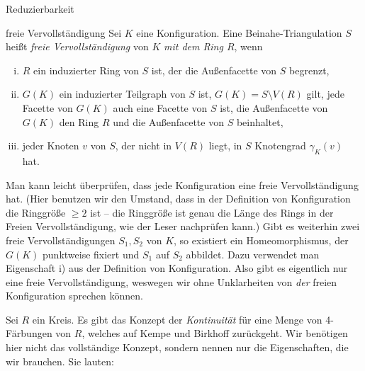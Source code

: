 \begin{section}{Reduzierbarkeit}
 \begin{definition}{freie Vervollständigung}
  Sei $K$ eine Konfiguration. Eine Beinahe-Triangulation $S$ heißt \textit{freie Vervollständigung} von $K$ \textit{mit dem Ring $R$}, wenn
  \begin{enumerate}[i)]
   \item $R$ ein induzierter Ring von $S$ ist, der die Außenfacette von $S$ begrenzt,
   \item $G(K)$ ein induzierter Teilgraph von $S$ ist, $G(K) = S \setminus V(R)$ gilt, jede Facette von $G(K)$ auch eine Facette von $S$ ist, die Außenfacette von $G(K)$ den Ring $R$ und die Außenfacette von $S$ beinhaltet,
   \item jeder Knoten $v$ von $S$, der nicht in $V(R)$ liegt, in $S$ Knotengrad $\gamma_K(v)$ hat.
  \end{enumerate}
 \end{definition}
 
 Man kann leicht überprüfen, dass jede Konfiguration eine freie Vervollständigung hat. (Hier benutzen wir den Umstand, dass in der Definition von Konfiguration die Ringgröße $\geq 2$ ist -- die Ringgröße ist genau die Länge des Rings in der Freien Vervollständigung, wie der Leser nachprüfen kann.) Gibt es weiterhin zwei freie Vervollständigungen $S_1, S_2$ von $K$, so existiert ein Homeomorphismus, der $G(K)$ punktweise fixiert und $S_1$ auf $S_2$ abbildet. Dazu verwendet man Eigenschaft i) aus der Definition von Konfiguration. Also gibt es eigentlich nur eine freie Vervollständigung, weswegen wir ohne Unklarheiten von \textit{der} freien Konfiguration sprechen können.
 
 Sei $R$ ein Kreis. Es gibt das Konzept der \textit{Kontinuität} für eine Menge von 4-Färbungen von $R$, welches auf Kempe \cite{AmJMath79} und Birkhoff \cite{AmJMath35} zurückgeht. Wir benötigen hier nicht das vollständige Konzept, sondern nennen nur die Eigenschaften, die wir brauchen. Sie lauten:

\end{section}
